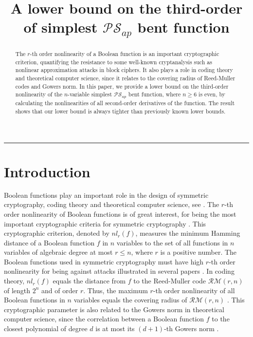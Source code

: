 \documentclass{article}
\title{A lower bound on the third-order of simplest $\mathcal{PS}_{ap}$ bent function}
\newcommand{\0}{\textbf{0}}
\newcommand{\1}{\textbf{1}}
\theoremstyle{plain}
\begin{document}
  \noindent
  \rule{\linewidth}{0.4pt}

\begin{abstract}
    The $r$-th order nonlinearity of a Boolean function is an important cryptographic criterion, quantifying the resistance to some well-known cryptanalysis such as nonlinear approximation attacks in block ciphers. 
    It also plays a role in coding theory and theoretical computer science, since it relates to the covering radius of Reed-Muller codes and Gowers norm. 
    In this paper, we provide a lower bound on the third-order nonlinearity of the $n$-variable simplest $\mathcal{PS}_{ap}$ bent function, where $n\ge 6$ is even, by calculating the nonlinearities of all second-order derivatives of the function. 
    The result shows that our lower bound is always tighter than previously known lower bounds.
\end{abstract}
    
\section{Introduction}
    Boolean functions play an important role in the design of symmetric cryptography, coding theory and theoretical computer science, see \cite{Carlet2020book,BhattacharyyaKSSZ2010gowers,CohenHLL1997RMcodecover}.
    The $r$-th order nonlinearity of Boolean functions is of great interest, for being the most important cryptographic criteria for symmetric cryptography \cite{Carlet2020book}.
    This cryptographic criterion, denoted by $nl_r(f)$, measures the minimum Hamming distance of a Boolean function $f$ in $n$ variables to the set of all functions in $n$ variables of algebraic degree at most $r\le n$, where $r$ is a positive number.
    The Boolean functions used in symmetric cryptography must have high $r$-th order nonlinearity for being against attacks illustrated in several papers \cite{Golic1996lower_order_approximation,IwataK1999highorderbentfunction,KnudsenR1996nonlinear_approximation,Courtois2002XL_algorithm_and_NL_r}.
    In coding theory, $nl_r(f)$ equals the distance from $f$ to the Reed-Muller code $\mathcal{RM}(r,n)$ of length $2^n$ and of order $r$.
    Thus, the maximum $r$-th order nonlinearity of all Boolean functions in $n$ variables equals the covering radius of $\mathcal{RM}(r,n)$ \cite{CohenHLL1997RMcodecover}.
    This cryptographic parameter is also related to the Gowers norm in theoretical computer science, since the correlation between a Boolean function $f$ to the closest polynomial of degree $d$ is at most its $(d+1)$-th Gowers norm \cite{BhattacharyyaKSSZ2010gowers}.
\end{document}
